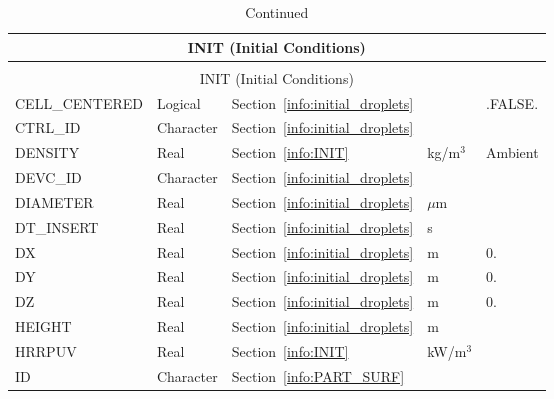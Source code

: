 \documentclass[11pt]{book}
\begin{document}
\begin{longtable}{@{\extracolsep{\fill}}|l|l|l|l|l|}
\caption[Initial conditions ({\ct INIT} namelist group)]{For more information see Section~\ref{info:INIT}.}
\label{tbl:INIT} \\
\hline
\multicolumn{5}{|c|}{{\ct INIT} (Initial Conditions)} \\
\hline \hline
\endfirsthead
\caption[]{Continued} \\
\hline
\multicolumn{5}{|c|}{{\ct INIT} (Initial Conditions)} \\
\hline \hline
\endhead
{\ct CELL\_CENTERED}            & Logical           & Section~\ref{info:initial_droplets}           &               & {\ct .FALSE.} \\ \hline
{\ct CTRL\_ID}                  & Character         & Section~\ref{info:initial_droplets}           &               &               \\ \hline
{\ct DENSITY}                   & Real              & Section~\ref{info:INIT}                       & kg/m$^3$      & Ambient       \\ \hline
{\ct DEVC\_ID}                  & Character         & Section~\ref{info:initial_droplets}           &               &               \\ \hline
{\ct DIAMETER}                  & Real              & Section~\ref{info:initial_droplets}           & $\mu$m        &               \\ \hline
{\ct DT\_INSERT}                & Real              & Section~\ref{info:initial_droplets}           & s             &               \\ \hline
{\ct DX}                        & Real              & Section~\ref{info:initial_droplets}           & m             & 0.            \\ \hline
{\ct DY}                        & Real              & Section~\ref{info:initial_droplets}           & m             & 0.            \\ \hline
{\ct DZ}                        & Real              & Section~\ref{info:initial_droplets}           & m             & 0.            \\ \hline
{\ct HEIGHT}                    & Real              & Section~\ref{info:initial_droplets}           & m             &               \\ \hline
{\ct HRRPUV}                    & Real              & Section~\ref{info:INIT}                       & kW/m$^3$      &               \\ \hline
{\ct ID}                        & Character         & Section~\ref{info:PART_SURF}                  &               &               \\ \hline

\end{longtable}
\end{document}
